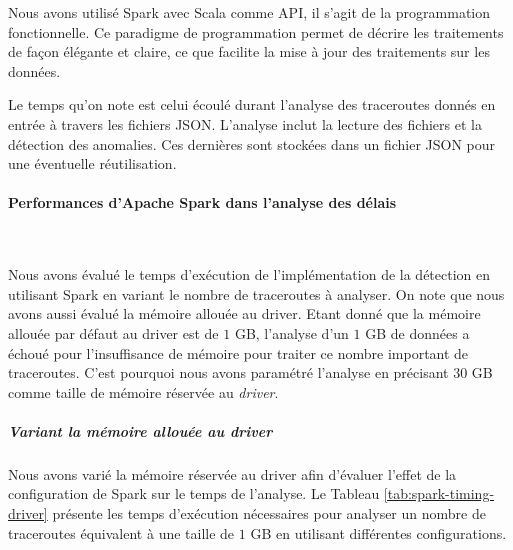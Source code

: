 Nous avons utilisé Spark avec Scala comme API, il s'agit de la programmation fonctionnelle. Ce paradigme de programmation permet de décrire les traitements de façon élégante et claire, ce que facilite la mise à jour des traitements sur les données. 

  
Le temps qu'on note est celui écoulé durant l'analyse des traceroutes donnés en entrée à travers les fichiers JSON. L'analyse inclut la lecture des fichiers et la détection des anomalies. Ces dernières sont stockées dans un fichier JSON pour une éventuelle réutilisation.



 

\paragraph{Performances d'Apache Spark dans l'analyse des délais }~

Nous avons évalué le temps d'exécution de l'implémentation de la détection en utilisant Spark en variant le nombre de traceroutes à analyser. On note que nous avons aussi évalué la mémoire allouée au driver. Etant donné que la mémoire allouée par défaut au driver est de $1$ GB, l'analyse  d'un $1$ GB de données  a échoué pour l'insuffisance de mémoire pour traiter ce nombre important de traceroutes. C'est pourquoi nous avons paramétré l'analyse en précisant $30$ GB comme taille de mémoire réservée au \textit{driver}.


\subparagraph{Variant la mémoire allouée au driver}

Nous avons varié la mémoire réservée au driver afin d'évaluer l'effet de la configuration de Spark sur le temps de l'analyse. Le Tableau 	\ref{tab:spark-timing-driver} présente les temps d'exécution nécessaires pour analyser un nombre de traceroutes équivalent à une taille de $ 1 $ GB en utilisant différentes configurations. 

